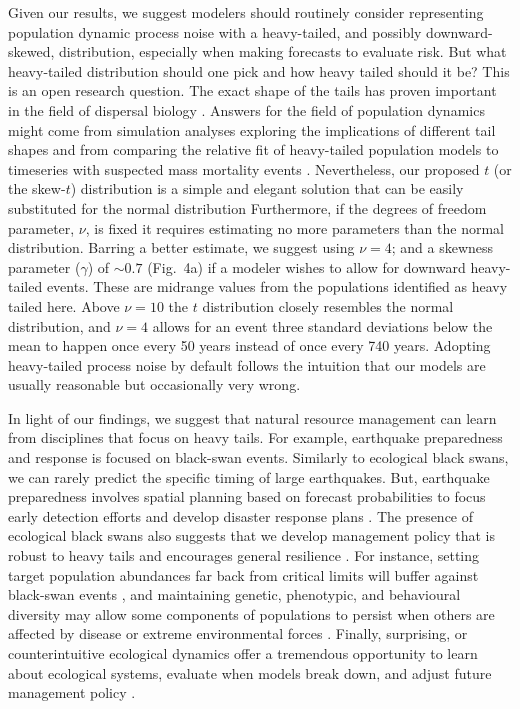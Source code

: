 Given our results, we suggest modelers should routinely consider representing population dynamic
process noise with a heavy-tailed, and possibly downward-skewed, distribution,
especially when making forecasts to evaluate risk.
But what heavy-tailed distribution should one pick
and how heavy tailed should it be?
This is an open research question.
The exact shape of the tails has proven important
in the field of dispersal biology \citep{kot1996, clark1999}.
Answers for the field of population dynamics
might come from simulation analyses exploring
the implications of different tail shapes and
from comparing the relative fit of heavy-tailed
population models to timeseries
with suspected mass mortality events
\citep[e.g.~the $t$ distribution compared to a mixture
of two normal distributions;][]{ward2007}.
Nevertheless, our proposed $t$ (or the skew-$t$) distribution
is a simple and elegant solution that
can be easily substituted for the normal distribution
Furthermore, if the degrees of freedom parameter, $\nu$,
is fixed
it requires estimating no more parameters
than the normal distribution.
Barring a better estimate,
we suggest using $\nu = 4$; and
a skewness parameter ($\gamma$) of $\sim 0.7$ (Fig.~4a)
if a modeler wishes to allow for downward heavy-tailed events.
These are midrange values from the populations identified as heavy tailed here.
Above $\nu  =  10$ the $t$ distribution closely resembles
the normal distribution,
and $\nu  = 4$ allows for an event
three standard deviations below the mean to happen
once every 50 years instead of once every 740 years.
Adopting heavy-tailed process noise by default follows the intuition
that our models are usually reasonable but occasionally very wrong.

In light of our findings, we suggest that natural resource management can
learn from disciplines that focus on heavy tails. For example, earthquake
preparedness and response is focused on black-swan events. Similarly to
ecological black swans, we can rarely predict the specific timing of large
earthquakes. But, earthquake preparedness involves spatial planning based on
forecast probabilities to focus early detection efforts and develop disaster
response plans \citep{nrc2007}. The presence of ecological black swans also suggests that we
develop management policy that is robust to heavy tails and encourages
general resilience \citep{carpenter2012}. For instance, setting target
population abundances far back from critical limits will buffer against black-swan
events \citep{caddy1996}, and maintaining genetic, phenotypic, and behavioural
diversity may allow some components of populations to persist when others are
affected by disease or extreme environmental forces \citep{schindler2010}.
Finally, surprising, or counterintuitive ecological dynamics offer a tremendous
opportunity to learn about ecological systems, evaluate when models break down,
and adjust future management policy \citep{doak2008, lindenmayer2010}.

